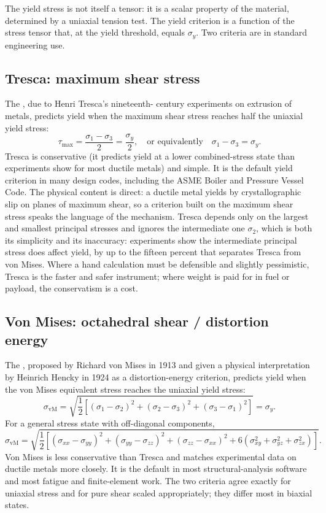 The yield stress is not itself a tensor: it is a scalar property of
the material, determined by a uniaxial tension test. The yield
criterion is a function of the stress tensor that, at the yield
threshold, equals $\sigma_y$. Two criteria are in standard
engineering use.

\subsection{Tresca: maximum shear stress}

The , due to Henri Tresca's nineteenth-
century experiments on extrusion of metals, predicts yield when the
maximum shear stress reaches half the uniaxial yield stress:
\[
\tau_{\max} = \frac{\sigma_1 - \sigma_3}{2} = \frac{\sigma_y}{2},
\quad \text{or equivalently} \quad \sigma_1 - \sigma_3 = \sigma_y.
\]
Tresca is conservative (it predicts yield at a lower combined-stress
state than experiments show for most ductile metals) and simple. It
is the default yield criterion in many design codes, including the
ASME Boiler and Pressure Vessel Code. The physical content is direct:
a ductile metal yields by crystallographic slip on planes of maximum
shear, so a criterion built on the maximum shear stress speaks the
language of the mechanism. Tresca depends only on the largest and
smallest principal stresses and ignores the intermediate one
$\sigma_2$, which is both its simplicity and its inaccuracy: experiments
show the intermediate principal stress does affect yield, by up to the
fifteen percent that separates Tresca from von Mises. Where a hand
calculation must be defensible and slightly pessimistic, Tresca is the
faster and safer instrument; where weight is paid for in fuel or
payload, the conservatism is a cost.

\subsection{Von Mises: octahedral shear / distortion energy}

The , proposed by Richard von Mises in
1913 and given a physical interpretation by Heinrich Hencky in 1924
as a distortion-energy criterion, predicts yield when the von Mises
equivalent stress reaches the uniaxial yield stress:
\[
\sigma_{\text{vM}} = \sqrt{\frac{1}{2}\left[(\sigma_1 - \sigma_2)^2
+ (\sigma_2 - \sigma_3)^2 + (\sigma_3 - \sigma_1)^2\right]} =
\sigma_y.
\]
For a general stress state with off-diagonal components,
\[
\sigma_{\text{vM}} = \sqrt{\frac{1}{2}\left[(\sigma_{xx} -
\sigma_{yy})^2 + (\sigma_{yy} - \sigma_{zz})^2 + (\sigma_{zz} -
\sigma_{xx})^2 + 6(\sigma_{xy}^2 + \sigma_{yz}^2 + \sigma_{zx}^2)
\right]}.
\]
Von Mises is less conservative than Tresca and matches experimental
data on ductile metals more closely. It is the default in most
structural-analysis software and most fatigue and finite-element
work. The two criteria agree exactly for uniaxial stress and for
pure shear scaled appropriately; they differ most in biaxial states.

